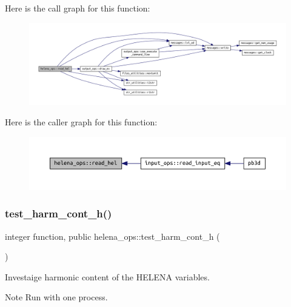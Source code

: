 Here is the call graph for this function\+:\nopagebreak
\begin{figure}[H]
\begin{center}
\leavevmode
\includegraphics[width=350pt]{namespacehelena__ops_ae05ba1182eb002d93c27ca4ff7ab8cf2_cgraph}
\end{center}
\end{figure}
Here is the caller graph for this function\+:\nopagebreak
\begin{figure}[H]
\begin{center}
\leavevmode
\includegraphics[width=350pt]{namespacehelena__ops_ae05ba1182eb002d93c27ca4ff7ab8cf2_icgraph}
\end{center}
\end{figure}
\mbox{\label{namespacehelena__ops_a83f2ad5dc967c7bae287b60fddb8eb0a}} 
\subsubsection{\texorpdfstring{test\+\_\+harm\+\_\+cont\+\_\+h()}{test\_harm\_cont\_h()}}
{\footnotesize\ttfamily integer function, public helena\+\_\+ops\+::test\+\_\+harm\+\_\+cont\+\_\+h (\begin{DoxyParamCaption}{ }\end{DoxyParamCaption})}



Investaige harmonic content of the H\+E\+L\+E\+NA variables. 

\begin{DoxyNote}{Note}
Run with one process. 
\end{DoxyNote}



